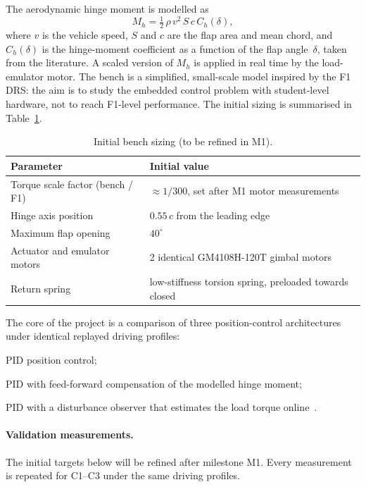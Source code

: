 \documentclass[11pt,a4paper]{article}
\begin{document}
The aerodynamic hinge moment is modelled as
\begin{equation}
  M_h = \tfrac{1}{2}\,\rho\, v^2\, S\, c\, C_h(\delta),
\end{equation}
where $v$ is the vehicle speed, $S$ and $c$ are the flap area and mean chord, and $C_h(\delta)$ is the hinge-moment coefficient as a function of the flap angle~$\delta$, taken from the literature. A scaled version of $M_h$ is applied in real time by the load-emulator motor. The bench is a simplified, small-scale model inspired by the F1 DRS: the aim is to study the embedded control problem with student-level hardware, not to reach F1-level performance. The initial sizing is summarised in Table~\ref{tab:sizing}.

\begin{table}[h]
\centering
\begin{tabular}{ll}
\toprule
Parameter & Initial value \\
\midrule
Torque scale factor (bench / F1) & $\approx 1/300$, set after M1 motor measurements \\
Hinge axis position & $0.55\,c$ from the leading edge \\
Maximum flap opening & $40^\circ$ \\
Actuator and emulator motors & 2 identical GM4108H-120T gimbal motors \\
Return spring & low-stiffness torsion spring, preloaded towards closed \\
\bottomrule
\end{tabular}
\caption{Initial bench sizing (to be refined in M1).}
\label{tab:sizing}
\end{table}

The core of the project is a comparison of three position-control architectures under identical replayed driving profiles:
\begin{description}[leftmargin=2.5em,labelwidth=2em]
  \item[C1] PID position control;
  \item[C2] PID with feed-forward compensation of the modelled hinge moment;
  \item[C3] PID with a disturbance observer that estimates the load torque online~\cite{sariyildiz2020}.
\end{description}

\paragraph{Validation measurements.} The initial targets below will be refined after milestone M1. Every measurement is repeated for C1--C3 under the same driving profiles.
\end{document}
